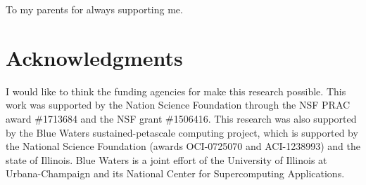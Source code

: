 \documentclass[edeposit,fullpage]{Classes/uiucthesis2009}
\begin{document}
\begin{dedication}
To my parents for always supporting me.
\end{dedication}

\chapter*{Acknowledgments}

I would like to think the funding agencies for make this research possible.
This work was supported by the Nation Science Foundation through the NSF PRAC
award \#1713684 and the NSF grant \#1506416.  This research was also supported
by the Blue Waters sustained-petascale computing project, which is supported by
the National Science Foundation (awards OCI-0725070 and ACI-1238993) and the
state of Illinois. Blue Waters is a joint effort of the University of Illinois
at Urbana-Champaign and its National Center for Supercomputing Applications.



\tableofcontents
\listoftables
\listoffigures


\mainmatter
\renewcommand{\thepage}{\arabic{page}}









\begin{appendices}
 
\end{appendices}

\renewcommand{\chaptername}{}
\renewcommand{\thechapter}{} 
%

%
{}
\end{document}
